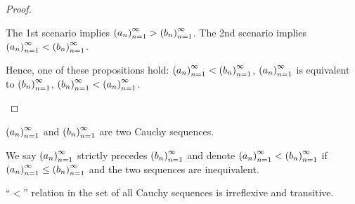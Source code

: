 \begin{proof}
\begin{itemize}
\begin{enumerate}[label={\textbf{Case \arabic*.}},itemsep=0pt,itemindent=1cm]
                        The 1st scenario implies $\seq{a_{n}} > \seq{b_{n}}$. The 2nd scenario implies $\seq{a_{n}} < \seq{b_{n}}$.
              \end{enumerate}

              Hence, one of these propositions hold: $\seq{a_{n}} < \seq{b_{n}}$, $\seq{a_{n}}$ is equivalent to $\seq{b_{n}}$, $\seq{b_{n}} < \seq{a_{n}}$.
    \end{itemize}
\end{proof}

\begin{definition}
    $\seq{a_{n}}$ and $\seq{b_{n}}$ are two Cauchy sequences.

    We say $\seq{a_{n}}$ strictly precedes $\seq{b_{n}}$ and denote $\seq{a_{n}} < \seq{b_{n}}$ if $\seq{a_{n}}\le\seq{b_{n}}$ and the two sequences are inequivalent.
\end{definition}

\begin{theorem}
    ``$<$'' relation in the set of all Cauchy sequences is irreflexive and transitive.
\end{theorem}

